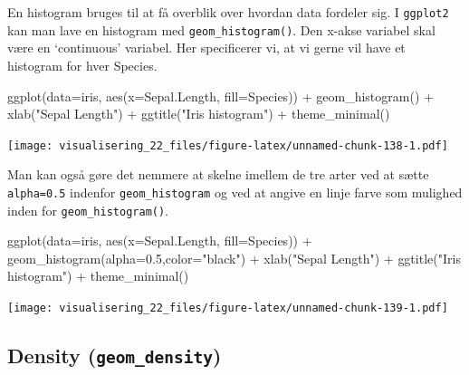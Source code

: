 \documentclass[
]{book}
\newenvironment{Shaded}{\begin{snugshade}}{\end{snugshade}}
\newcommand{\AttributeTok}[1]{\textcolor[rgb]{0.77,0.63,0.00}{#1}}
\newcommand{\FloatTok}[1]{\textcolor[rgb]{0.00,0.00,0.81}{#1}}
\newcommand{\FunctionTok}[1]{\textcolor[rgb]{0.00,0.00,0.00}{#1}}
\newcommand{\NormalTok}[1]{#1}
\newcommand{\SpecialCharTok}[1]{\textcolor[rgb]{0.00,0.00,0.00}{#1}}
\newcommand{\StringTok}[1]{\textcolor[rgb]{0.31,0.60,0.02}{#1}}
\begin{document}
En histogram bruges til at få overblik over hvordan data fordeler sig. I \texttt{ggplot2} kan man lave en histogram med \texttt{geom\_histogram()}. Den x-akse variabel skal være en `continuous' variabel. Her specificerer vi, at vi gerne vil have et histogram for hver Species.

\begin{Shaded}
\begin{Highlighting}[]
\FunctionTok{ggplot}\NormalTok{(}\AttributeTok{data=}\NormalTok{iris, }\FunctionTok{aes}\NormalTok{(}\AttributeTok{x=}\NormalTok{Sepal.Length, }\AttributeTok{fill=}\NormalTok{Species)) }\SpecialCharTok{+} 
  \FunctionTok{geom\_histogram}\NormalTok{() }\SpecialCharTok{+} 
  \FunctionTok{xlab}\NormalTok{(}\StringTok{"Sepal Length"}\NormalTok{) }\SpecialCharTok{+} 
  \FunctionTok{ggtitle}\NormalTok{(}\StringTok{"Iris histogram"}\NormalTok{) }\SpecialCharTok{+} 
  \FunctionTok{theme\_minimal}\NormalTok{()}
\end{Highlighting}
\end{Shaded}

\texttt{[image: visualisering\_22\_files/figure-latex/unnamed-chunk-138-1.pdf]}

Man kan også gøre det nemmere at skelne imellem de tre arter ved at sætte \texttt{alpha=0.5} indenfor \texttt{geom\_histogram} og ved at angive en linje farve som mulighed inden for \texttt{geom\_histogram()}.

\begin{Shaded}
\begin{Highlighting}[]
\FunctionTok{ggplot}\NormalTok{(}\AttributeTok{data=}\NormalTok{iris, }\FunctionTok{aes}\NormalTok{(}\AttributeTok{x=}\NormalTok{Sepal.Length, }\AttributeTok{fill=}\NormalTok{Species)) }\SpecialCharTok{+} 
  \FunctionTok{geom\_histogram}\NormalTok{(}\AttributeTok{alpha=}\FloatTok{0.5}\NormalTok{,}\AttributeTok{color=}\StringTok{"black"}\NormalTok{) }\SpecialCharTok{+} 
  \FunctionTok{xlab}\NormalTok{(}\StringTok{"Sepal Length"}\NormalTok{) }\SpecialCharTok{+} 
  \FunctionTok{ggtitle}\NormalTok{(}\StringTok{"Iris histogram"}\NormalTok{) }\SpecialCharTok{+} 
  \FunctionTok{theme\_minimal}\NormalTok{()}
\end{Highlighting}
\end{Shaded}

\texttt{[image: visualisering\_22\_files/figure-latex/unnamed-chunk-139-1.pdf]}

\hypertarget{density-geom_density}{%
\subsection{\texorpdfstring{Density (\texttt{geom\_density})}{Density (geom\_density)}}\label{density-geom_density}}
\end{document}

